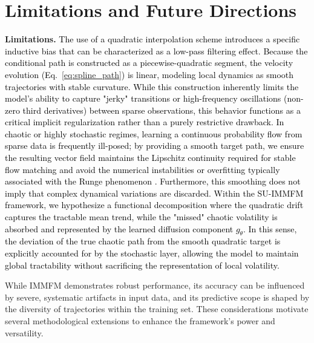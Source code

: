 \documentclass[twoside]{article}
\begin{document}
\section{Limitations and Future Directions}
\label{app:limitation_future_work}

\textbf{Limitations.} \textcolor{black}{The use of a quadratic interpolation scheme introduces a specific inductive bias that can be characterized as a low-pass filtering effect. Because the conditional path is constructed as a piecewise-quadratic segment, the velocity evolution (Eq.~\ref{eq:spline_path}) is linear, modeling local dynamics as smooth trajectories with stable curvature. While this construction inherently limits the model's ability to capture "jerky" transitions or high-frequency oscillations (non-zero third derivatives) between sparse observations, this behavior functions as a critical implicit regularization rather than a purely restrictive drawback. In chaotic or highly stochastic regimes, learning a continuous probability flow from sparse data is frequently ill-posed; by providing a smooth target path, we ensure the resulting vector field maintains the Lipschitz continuity required for stable flow matching and avoid the numerical instabilities or overfitting typically associated with the Runge phenomenon \citep{lipman2022flow}. Furthermore, this smoothing does not imply that complex dynamical variations are discarded. Within the SU-IMMFM framework, we hypothesize a functional decomposition where the quadratic drift captures the tractable mean trend, while the "missed" chaotic volatility is absorbed and represented by the learned diffusion component $g_\theta$. In this sense, the deviation of the true chaotic path from the smooth quadratic target is explicitly accounted for by the stochastic layer, allowing the model to maintain global tractability without sacrificing the representation of local volatility.}

While IMMFM demonstrates robust performance, its accuracy can be influenced by severe, systematic artifacts in input data, and its predictive scope is shaped by the diversity of trajectories within the training set. These considerations motivate several methodological extensions to enhance the framework's power and versatility.
\end{document}
